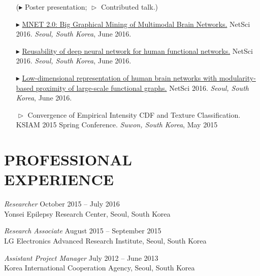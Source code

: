 \documentclass[margin, 10pt]{res} %
\begin{document}
\begin{resume}
\begin{itemize}
	\item[]($\blacktriangleright$ Poster presentation; $\vartriangleright$ Contributed talk.)
	\item[$\blacktriangleright$] 
	\href{http://kyoustat.com/presentation/2016_NetSci_MNET.pdf}{MNET 2.0: Big Graphical Mining of Multimodal Brain Networks.} NetSci 2016. \emph{Seoul, South Korea}, June 2016.
	\item[$\blacktriangleright$]
	\href{http://kyoustat.com/presentation/2016_NetSci_DeepLearning.pdf}{Reusability of deep neural network for human functional networks.} NetSci 2016. \emph{Seoul, South Korea}, June 2016.
	\item[$\blacktriangleright$] 
	\href{http://kyoustat.com/presentation/2016_NetSci_LAMP.pdf}{Low-dimensional representation of human brain networks with modularity-based proximity of large-scale functional graphs.} NetSci 2016. \emph{Seoul, South Korea}, June 2016.
	\item[$\vartriangleright$]
	Convergence of Empirical Intensity CDF and Texture Classification. KSIAM 2015 Spring Conference. \emph{Suwon, South Korea}, May 2015
\end{itemize}


\section{\sf PROFESSIONAL \\ EXPERIENCE} 

{\sl Researcher} \hfill October 2015 -- July 2016 \\
Yonsei Epilepsy Research Center, Seoul, South Korea

{\sl Research Associate} \hfill August 2015 -- September 2015 \\
LG Electronics Advanced Research Institute, Seoul, South Korea

{\sl Assistant Project Manager} \hfill July 2012 -- June 2013 \\
Korea International Cooperation Agency, Seoul, South Korea

\vspace{.2cm}




\end{resume}
\end{document}

